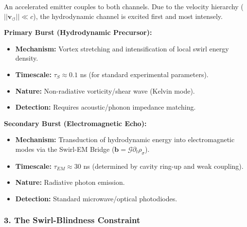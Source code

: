                 An accelerated emitter couples to both channels. Due to the velocity hierarchy ($||\mathbf{v}_{\circlearrowleft}|| \ll c$), the hydrodynamic channel is excited first and most intensely.

                \textbf{Primary Burst (Hydrodynamic Precursor):}

                \begin{itemize}
                        \item \textbf{Mechanism:} Vortex stretching and intensification of local swirl energy density.


                        \item \textbf{Timescale:} $\tau_S \approx 0.1$ ns (for standard experimental parameters).


                        \item \textbf{Nature:} Non-radiative vorticity/shear wave (Kelvin mode).


                        \item \textbf{Detection:} Requires acoustic/phonon impedance matching.


                \end{itemize}
                \textbf{Secondary Burst (Electromagnetic Echo):}

                \begin{itemize}
                        \item \textbf{Mechanism:} Transduction of hydrodynamic energy into electromagnetic modes via the Swirl-EM Bridge ($\mathbf{b} = \mathcal{G} \partial_t \rho_{\sigma}$).


                        \item \textbf{Timescale:} $\tau_{EM} \approx 30$ ns (determined by cavity ring-up and weak coupling).


                        \item \textbf{Nature:} Radiative photon emission.


                        \item \textbf{Detection:} Standard microwave/optical photodiodes.


                \end{itemize}


            \subsubsection*{\textbf{3. The Swirl-Blindness Constraint}}


